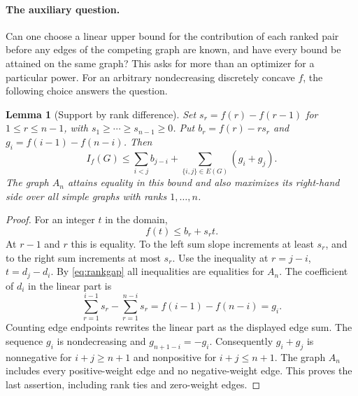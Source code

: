 \documentclass[11pt,a4paper]{article}
\newtheorem{lemma}[theorem]{Lemma}
\theoremstyle{definition}\newtheorem{problem}[theorem]{Problem}
\begin{document}
\paragraph{The auxiliary question.}
Can one choose a linear upper bound for the contribution of each ranked
pair before any edges of the competing graph are known, and have every
bound be attained on the same graph? This asks for more than
an optimizer for a particular power. For an arbitrary nondecreasing
discretely concave $f$, the following choice answers the question.

\begin{lemma}[Support by rank difference]\label{lem:rank}
Set $s_r=f(r)-f(r-1)$ for $1\le r\le n-1$, with
$s_1\ge\cdots\ge s_{n-1}\ge0$. Put $b_r=f(r)-r s_r$ and
$g_i=f(i-1)-f(n-i)$. Then
\[
 I_f(G)\le \sum_{i<j} b_{j-i}
                +\sum_{\{i,j\}\in E(G)}(g_i+g_j).
\]
The graph $A_n$ attains equality in this bound and also maximizes its
right-hand side over all simple graphs with ranks $1,\ldots,n$.
\end{lemma}
\begin{proof}
For an integer $t$ in the domain,
\[
 f(t)\le b_r+s_r t .
\]
At $r-1$ and $r$ this is equality. To the left sum slope increments
at least $s_r$, and to the right sum increments at most $s_r$.
Use the inequality at $r=j-i$, $t=d_j-d_i$. By
\eqref{eq:rankgap} all inequalities are equalities for $A_n$.
The coefficient of $d_i$ in the linear part is
\[
  \sum_{r=1}^{i-1}s_r-\sum_{r=1}^{n-i}s_r
   = f(i-1)-f(n-i)=g_i .
\]
Counting edge endpoints rewrites the linear part as the displayed edge
sum. The sequence $g_i$ is nondecreasing and $g_{n+1-i}=-g_i$.
Consequently $g_i+g_j$ is nonnegative for $i+j\ge n+1$ and nonpositive
for $i+j\le n+1$. The graph $A_n$ includes every positive-weight edge
and no negative-weight edge. This proves the last assertion, including
rank ties and zero-weight edges.
\end{proof}
\end{document}

